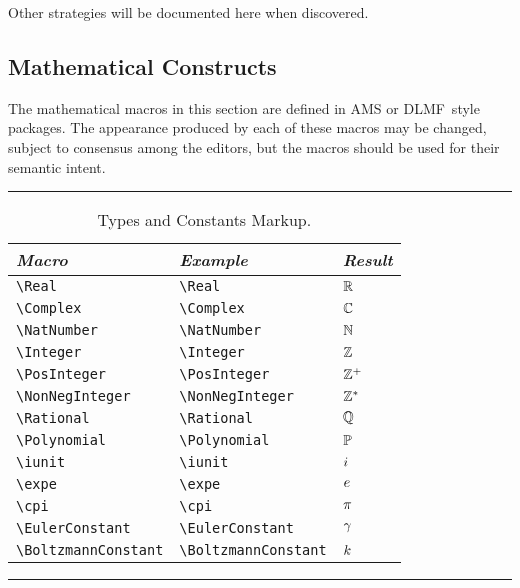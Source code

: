 \documentclass[twoside]{article}
\newcommand{\DLMF}{{\sc DLMF}}
\newenvironment{Table}[1]{%
   \begin{table}[htb]\hrule\begin{centering}\caption{#1}}{%
   \par\end{centering}\hrule\end{table}}
\newenvironment{Tabular}[1]{%
   \begingroup\def\arraystretch{1.3}\small \begin{tabular}{#1}}{%
   \end{tabular}\endgroup}
\begin{document}
Other strategies will be documented here when discovered.

\subsection{Mathematical Constructs}\label{sec:genmath}
The mathematical macros in this section are defined in AMS or \DLMF\ style packages.
The appearance produced by each of these macros may be changed, subject to consensus
among the editors, but the macros should be used for their semantic intent.

\begin{Table}{Types and Constants Markup.\label{tab:typesmarkup}}
\begin{Tabular}{lll}
\textit{Macro} & \textit{Example} & \textit{Result} \\\hline
\verb|\Real| &\verb|\Real| & $\mathbb{R}$ \\
\verb|\Complex| &\verb|\Complex| & $\mathbb{C}$ \\
\verb|\NatNumber| &\verb|\NatNumber| & $\mathbb{N}$ \\
\verb|\Integer| &\verb|\Integer| & $\mathbb{Z}$ \\
\verb|\PosInteger| &\verb|\PosInteger| & ${\mathbb{Z}^{+}}$ \\
\verb|\NonNegInteger| &\verb|\NonNegInteger| & ${\mathbb{Z}^{*}}$ \\
\verb|\Rational| &\verb|\Rational| & $\mathbb{Q}$ \\
\verb|\Polynomial| &\verb|\Polynomial| & $\mathbb{P}$ \\
\hline
\verb|\iunit| &\verb|\iunit| & ${i}$ \\ 
\verb|\expe| &\verb|\expe| & ${e}$ \\ 
\verb|\cpi| &\verb|\cpi| & ${\pi}$ \\ 
\verb|\EulerConstant| &\verb|\EulerConstant| & $\gamma$ \\ 
\verb|\BoltzmannConstant| &\verb|\BoltzmannConstant| & $k$ \\ 
\end{Tabular}
\end{Table}
\end{document}
